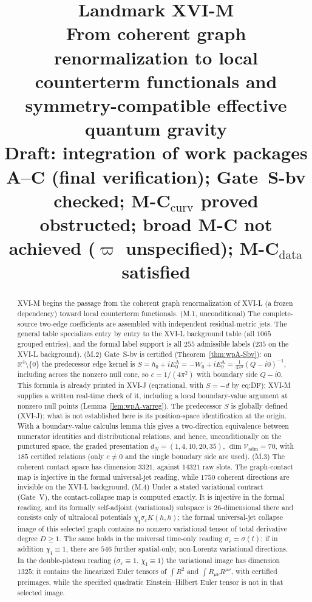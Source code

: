 \documentclass{article}
\title{Landmark XVI-M\\
\large From coherent graph renormalization to local counterterm functionals and symmetry-compatible effective quantum gravity\\
\large Draft: integration of work packages A--C (final verification); Gate~S-bv checked; M-C$_{\mathrm{curv}}$ proved obstructed; broad M-C not achieved ($\varpi$ unspecified); M-C$_{\mathrm{data}}$ satisfied}
\author{}
\date{}
\theoremstyle{remark}
\newcommand{\sigeps}{\sigma_\varepsilon}
\newcommand{\chiI}{\chi_{\mathrm I}}
\begin{document}
\setlength{\emergencystretch}{3em}
\maketitle

\begin{abstract}
XVI-M begins the passage from the coherent graph renormalization of XVI-L (a frozen dependency) toward local counterterm functionals.
(M.1, unconditional) The complete-source two-edge coefficients are assembled with independent residual-metric jets.
The general table specializes entry by entry to the XVI-L background table (all $1065$ grouped entries), and the formal label support is all $255$ admissible labels ($235$ on the XVI-L background).
(M.2) Gate~S-bv is certified (Theorem~\ref{thm:wpA-Sbv}): on $\mathbb R^4\setminus\{0\}$ the predecessor edge kernel is $S=h_0+iE_0^{\mathrm A}=-W_0+iE_0^{\mathrm A}=\frac1{4\pi^2}(Q-i0)^{-1}$, including across the nonzero null cone, so $c=1/(4\pi^2)$ with boundary side $Q-i0$. This formula is already printed in XVI-J (eq:rational, with $S=-d$ by eq:DF); XVI-M supplies a written real-time check of it, including a local boundary-value argument at nonzero null points (Lemma~\ref{lem:wpA-varreg}). The predecessor $S$ is globally defined (XVI-J); what is not established here is its position-space identification at the origin.
With a boundary-value calculus lemma this gives a two-direction equivalence between numerator identities and distributional relations, and hence, unconditionally on the punctured space, the graded presentation $d_N=(1,4,10,20,35)$, $\dim\mathcal V_{\mathrm{adm}}=70$, with $185$ certified relations (only $c\neq0$ and the single boundary side are used).
(M.3) The coherent contact space has dimension $3321$, against $14321$ raw slots.
The graph-contact map is injective in the formal universal-jet reading, while $1750$ coherent directions are invisible on the XVI-L background.
(M.4) Under a stated variational contract (Gate~V), the contact-collapse map is computed exactly.
It is injective in the formal reading, and its formally self-adjoint (variational) subspace is $26$-dimensional there and consists only of ultralocal potentials $\chiI\sigeps K(h,h)$; the formal universal-jet collapse image of this selected graph contains no nonzero variational tensor of total derivative degree $D\ge1$.
The same holds in the universal time-only reading $\sigeps=\sigma(t)$; if in addition $\chiI\equiv1$, there are $546$ further spatial-only, non-Lorentz variational directions.
In the double-plateau reading ($\sigeps\equiv1$, $\chiI\equiv1$) the variational image has dimension $1325$; it contains the linearized Euler tensors of $\int R^2$ and $\int R_{\mu\nu}R^{\mu\nu}$, with certified preimages, while the specified quadratic Einstein--Hilbert Euler tensor is not in that selected image.

\end{abstract}
\end{document}
